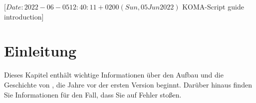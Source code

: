 %
%
%
%
%
%
%

                 [$Date: 2022-06-05 12:40:11 +0200 (Sun, 05 Jun 2022) $
                  KOMA-Script guide introduction]

\chapter{Einleitung}

Dieses Kapitel enthält wichtige Informationen über
den Aufbau  und die Geschichte von
\KOMAScript, die Jahre vor der ersten Version beginnt. Darüber hinaus finden
Sie Informationen für den Fall, dass Sie %
\iffalse %
 \KOMAScript{} noch nicht installiert haben, oder %
\fi%
auf Fehler stoßen.

